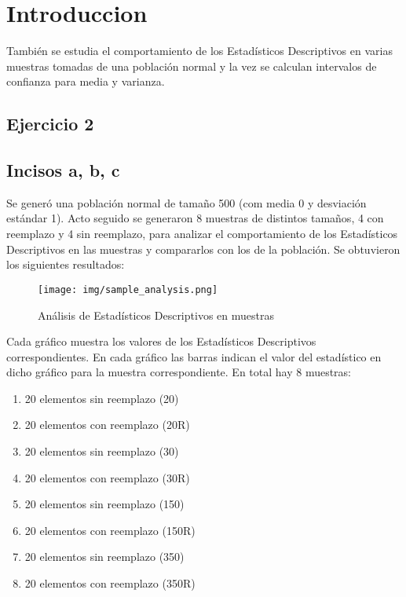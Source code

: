 \documentclass[a4paper,10pt,twocolumn]{article}
\begin{document}
\section{Introduccion}
	También se estudia el comportamiento de los Estadísticos Descriptivos en varias muestras tomadas de una población normal y la vez se calculan intervalos de confianza para media y varianza.
	
\subsection{Ejercicio 2}

	\subsection{Incisos a, b, c}
	Se generó una población normal de tamaño 500 (com media 0 y desviación estándar 1). Acto seguido se generaron 8 muestras de distintos tamaños, 4 con reemplazo y 4 sin reemplazo, para analizar el comportamiento de los Estadísticos Descriptivos en las muestras y compararlos con los de la población. Se obtuvieron los siguientes resultados:
	
	\begin{figure}[htb]
		\begin{center}
			\texttt{[image: img/sample\_analysis.png]}
		\end{center}
		\caption{Análisis de Estadísticos Descriptivos en muestras}%
		\end{figure}

Cada gráfico muestra los valores de los Estadísticos Descriptivos correspondientes. En cada gráfico las barras indican el valor del estadístico en dicho gráfico para la muestra correspondiente. En total hay 8 muestras:

\begin{enumerate}
	\item 20 elementos sin reemplazo (20)
	\item 20 elementos con reemplazo (20R)
	
	\item 20 elementos sin reemplazo (30)
	\item 20 elementos con reemplazo (30R)
	
	\item 20 elementos sin reemplazo (150)
	\item 20 elementos con reemplazo (150R)
	
	\item 20 elementos sin reemplazo (350)
	\item 20 elementos con reemplazo (350R)
\end{enumerate}
\end{document}
